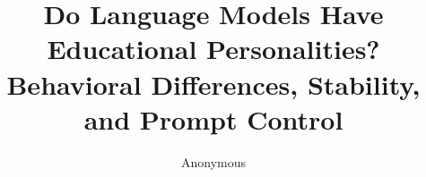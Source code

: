 \documentclass[11pt]{article}
\title{Do Language Models Have Educational Personalities?\\
Behavioral Differences, Stability, and Prompt Control}
\author{Anonymous}
\date{}
\begin{document}
\maketitle






\FloatBarrier

\label{sec:main-end}
\clearpage




\appendix








\end{document}
